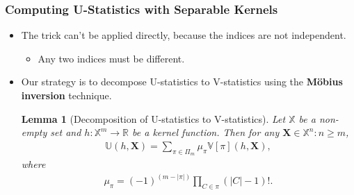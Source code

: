 \documentclass[9pt]{beamer}
\theoremstyle{mystyle}
\newtheorem{mylemma}{Lemma}
\theoremstyle{mystyletwo}
\def\bbX{\mathbb{X}}
\def\bbR{\mathbb{R}}
\def\bbR{\mathbb{R}}
\newcommand{\sPi}{\pi}
\newcommand{\ustat}{\mathbb{U}}
\newcommand{\vstat}{\mathbb{V}}
\newcommand{\partition}{\Pi}
\newcommand{\partitionp}[1]{\partition_{#1}}
\begin{document}
\begin{frame}
    \frametitle{Computing U-Statistics with Separable Kernels}
    \begin{itemize}
        \item The trick can't be applied directly, because the indices are not independent.
              \begin{itemize}
                  \item Any two indices must be different.
              \end{itemize}
        \item Our strategy is to decompose U-statistics to V-statistics using the \textbf{M\"obius inversion} technique.
              \begin{mylemma}[Decomposition of U-statistics to V-statistics]
                  \label{lem:decomp_u_to_v}
                  Let $\bbX$ be a non-empty set and $h: \bbX^{m} \rightarrow \bbR$ be a kernel function. Then for any $\bm{X} \in \bbX^n: n \geq m$,
                  \begin{align*}
                      \ustat(h,\bm{X}) = \sum_{\sPi \in \partitionp{m}}
                      \mu_\sPi \vstat[\sPi](h, \bm{X}),
                  \end{align*}
                  where
                  \begin{align*}
                      \mu_\sPi = (-1)^{(m-|\sPi|)} \prod_{C \in \sPi} (|C| - 1)!.
                  \end{align*}
              \end{mylemma}
    \end{itemize}
\end{frame}
\end{document}
